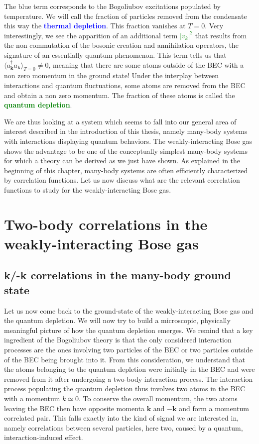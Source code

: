 The blue term corresponds to the Bogoliubov excitations populated by temperature. We will call the fraction of particles removed from the condensate this way the \textcolor{blue}{\textbf{thermal depletion}}. This fraction vanishes at $T=0$. Very interestingly, we see the apparition of an additional term \textcolor{green}{$|v_k|^2$} that results from the non commutation of the bosonic creation and annihilation operators, the signature of an essentially quantum phenomenon. This term tells us that $\langle a^{\dagger}_{\bm{k}}  a_{\bm{k}} \rangle_{T=0} \neq 0$, meaning that there are some atoms outside of the BEC with a non zero momentum in the ground state! Under the interplay between interactions and quantum fluctuations, some atoms are removed from the BEC and obtain a non zero momentum. The fraction of these atoms is called the \textcolor{green}{\textbf{quantum depletion}}. 

We are thus looking at a system which seems to fall into our general area of interest described in the introduction of this thesis, namely many-body systems with interactions displaying quantum behaviors. The weakly-interacting Bose gas shows the advantage to be one of the conceptually simplest many-body systems for which a theory can be derived as we just have shown. As explained in the beginning of this chapter, many-body systems are often efficiently characterized by correlation functions. Let us now discuss what are the relevant correlation functions to study for the weakly-interacting Bose gas.


\section{Two-body correlations in the weakly-interacting Bose gas}

\subsection{k/-k correlations in the many-body ground state}

Let us now come back to the ground-state of the weakly-interacting Bose gas and the quantum depletion. We will now try to build a microscopic, physically meaningful picture of how the quantum depletion emerges. We remind that a key ingredient of the Bogoliubov theory is that the only considered interaction processes are the ones involving two particles of the BEC or two particles outside of the BEC being brought into it. From this consideration, we understand that the atoms belonging to the quantum depletion were initially in the BEC and were removed from it after undergoing a two-body interaction process. The interaction process populating the quantum depletion thus involves two atoms in the BEC with a momentum $k \simeq 0$. To conserve the overall momentum, the two atoms leaving the BEC then have opposite momenta $\bm{k}$ and $-\bm{k}$ and form a momentum correlated pair. This falls exactly into the kind of signal we are interested in, namely correlations between several particles, here two, caused by a quantum, interaction-induced effect.

